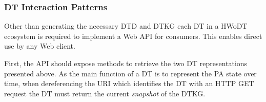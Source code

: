 \subsubsection{\acl{DT} Interaction Patterns}

Other than generating the necessary \ac{DTD} and \ac{DTKG} each \ac{DT} in a \ac{HWoDT} ecosystem is required to implement a Web \ac{API} for consumers. This enables direct use by any Web client.

First, the \ac{API} should expose methods to retrieve the two \ac{DT} representations presented above.
%
As the main function of a \ac{DT} is to represent the \ac{PA} state over time, when dereferencing the \ac{URI} which identifies the \ac{DT} with an HTTP GET request the \ac{DT} must return the current \emph{snapshot} of the \ac{DTKG}.

